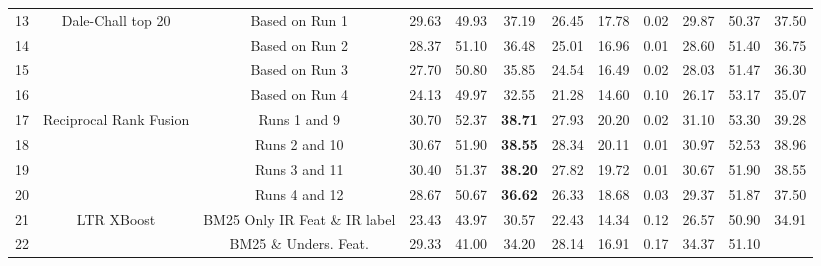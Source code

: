 \begin{table}
{\begin{tabular}{c|c|c|ccc|cc|c|ccc}
\midrule 
13 & \multirow{4}{*}{Dale-Chall top 20} & Based on Run 1 & 29.63 & 49.93 & 37.19 & 26.45 & 17.78 & 0.02 & 29.87 & 50.37 & 37.50\tabularnewline
14 &  & Based on Run 2 & 28.37 & 51.10 & 36.48 & 25.01 & 16.96 & 0.01 & 28.60 & 51.40 & 36.75\tabularnewline
15 &  & Based on Run 3  & 27.70 & 50.80 & 35.85 & 24.54 & 16.49 & 0.02 & 28.03 & 51.47 & 36.30\tabularnewline
16 &  & Based on Run 4 & 24.13 & 49.97 & 32.55 & 21.28 & 14.60 & 0.10 & 26.17 & 53.17 & 35.07\tabularnewline
\midrule 
17 & \multirow{4}{*}{Reciprocal Rank Fusion} & Runs 1 and 9 & 30.70 & 52.37 & \textbf{38.71} & 27.93 & 20.20 & 0.02 & 31.10 & 53.30 & 39.28\tabularnewline
18 &  & Runs 2 and 10 & 30.67 & 51.90 & \textbf{38.55} & 28.34 & 20.11 & 0.01 & 30.97 & 52.53 & 38.96\tabularnewline
19 &  & Runs 3 and 11 & 30.40 & 51.37 & \textbf{38.20} & 27.82 & 19.72 & 0.01 & 30.67 & 51.90 & 38.55\tabularnewline
20 &  & Runs 4 and 12 & 28.67 & 50.67 & \textbf{36.62} & 26.33 & 18.68 & 0.03 & 29.37 & 51.87 & 37.50\tabularnewline
\midrule 
\midrule 
21 & \multirow{2}{*}{LTR XBoost} & BM25 Only IR Feat \& IR label & 23.43 & 43.97 & 30.57 & 22.43 & 14.34 & 0.12 & 26.57 & 50.90 & 34.91\tabularnewline
22 &  & BM25 \& Unders. Feat. & 29.33 & 41.00 & 34.20 & 28.14 & 16.91 & 0.17 & 34.37 & 51.10 & \color{red}{\textbf{41.10}}\tabularnewline
\bottomrule
\end{tabular}
%
} %
\end{table}
